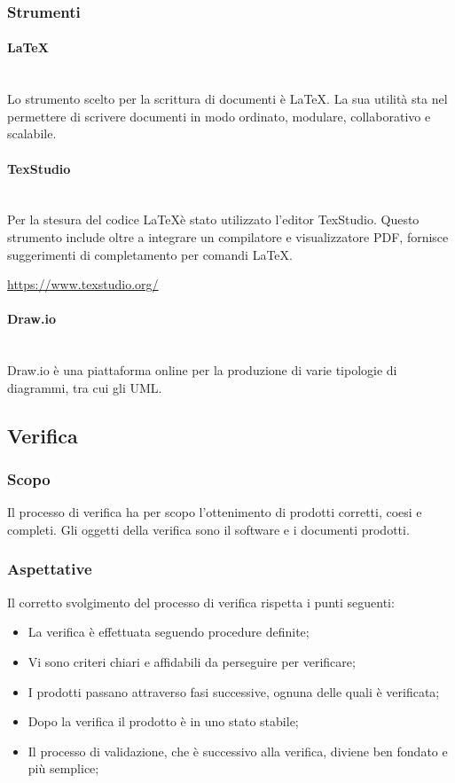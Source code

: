 		\subsubsection{Strumenti}
		\paragraph{\LaTeX} \mbox{}\\
		Lo strumento scelto per la scrittura di documenti è \LaTeX. La sua utilità sta nel permettere di scrivere documenti in modo ordinato, modulare, collaborativo e scalabile.
		\paragraph{TexStudio} \mbox{}\\
		Per la stesura del codice \LaTeX è stato utilizzato l'editor TexStudio. Questo strumento include oltre a integrare un compilatore e visualizzatore PDF, fornisce suggerimenti di completamento per comandi \LaTeX{}. \newline
		\centerline{\url{https://www.texstudio.org/}}
		\paragraph{Draw.io} \mbox{}\\
		Draw.io è una piattaforma online per la produzione di varie tipologie di diagrammi, tra cui gli UML.
	\subsection{Verifica}
		\subsubsection{Scopo}
		Il processo di verifica ha per scopo l'ottenimento di prodotti corretti, coesi e completi. Gli oggetti della verifica sono il software e i documenti prodotti. 
		\subsubsection{Aspettative}
		Il corretto svolgimento del processo di verifica rispetta i punti seguenti:	
		\begin{itemize}
			\item La verifica è effettuata seguendo procedure definite;
			\item Vi sono criteri chiari e affidabili da perseguire per verificare;
			\item I prodotti passano attraverso fasi successive, ognuna delle quali è verificata;
			\item Dopo la verifica il prodotto è in uno stato stabile;
			\item Il processo di validazione, che è successivo alla verifica, diviene ben fondato e più semplice;
		\end{itemize}
